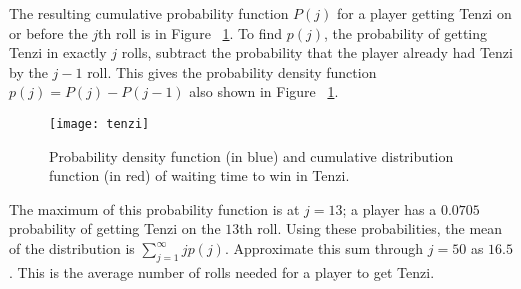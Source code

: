 \documentclass[12pt]{article}
\begin{document}
The resulting cumulative probability function \( P(j) \) for a player
getting Tenzi on or before the \( j \)th roll is in Figure~%
\ref{fig:games:tenzicdf}.  To find \( p(j) \), the probability of
getting Tenzi in exactly \( j \) rolls, subtract the probability that
the player already had Tenzi by the \( j - 1 \) roll.  This gives the
probability density function \( p(j)=P(j) - P(j - 1) \) also shown in
Figure~%
\ref{fig:games:tenzicdf}.
\begin{figure}
    \centering
    \texttt{[image: tenzi]}
    \caption{Probability density function (in blue) and cumulative
    distribution function (in red) of waiting time to win in Tenzi.}%
    \label{fig:games:tenzicdf}
\end{figure}
The maximum of this probability function is at \( j=13 \); a player has
a \( 0.0705 \) probability of getting Tenzi on the \( 13 \)th roll.
Using these probabilities, the mean of the distribution is \( \sum_{j=1}^
{\infty} j p(j) \).  Approximate this sum through \( j=50 \) as \( 16.5 \).
This is the average number of rolls needed for a player to get Tenzi.
\end{document}
